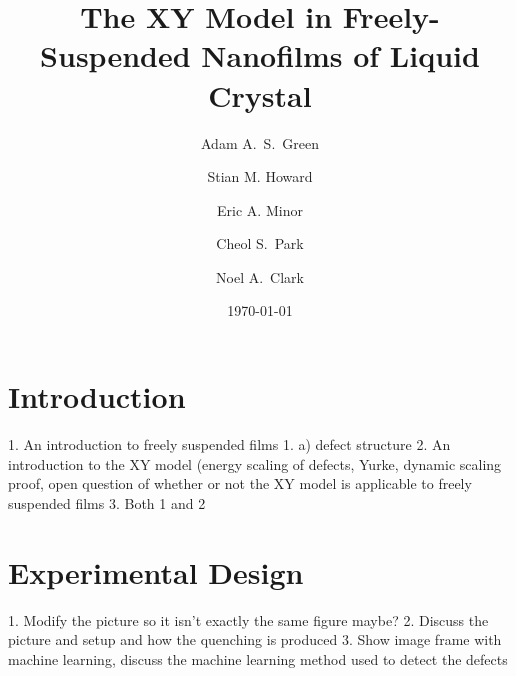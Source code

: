 \documentclass[superscriptaddress,floatfix,draft,prl]{revtex4-1}
\begin{document}



\title{The XY Model in Freely-Suspended Nanofilms of Liquid Crystal}
\date{\today}

\author{Adam A.~S.~Green}

\author{Stian M. Howard}

\author{Eric A. Minor}



\author{Cheol S.~Park}

\author{Noel A.~Clark}


\newcommand{\jem}[1]{{{\color{black} #1}}}

\begin{abstract}

\end{abstract}



\maketitle

\section{Introduction}
1. An introduction to freely suspended films
1. a) defect structure
2. An introduction to the XY model (energy scaling of defects, Yurke, dynamic scaling
proof, open question of whether or not the XY model is applicable to freely
suspended films
3. Both 1 and 2



\section{Experimental Design}
1. Modify the picture so it isn't exactly the same figure maybe?
2. Discuss the picture and setup and how the quenching is produced
3. Show image frame with machine learning, discuss the machine learning method used to detect the
defects
\end{document}
